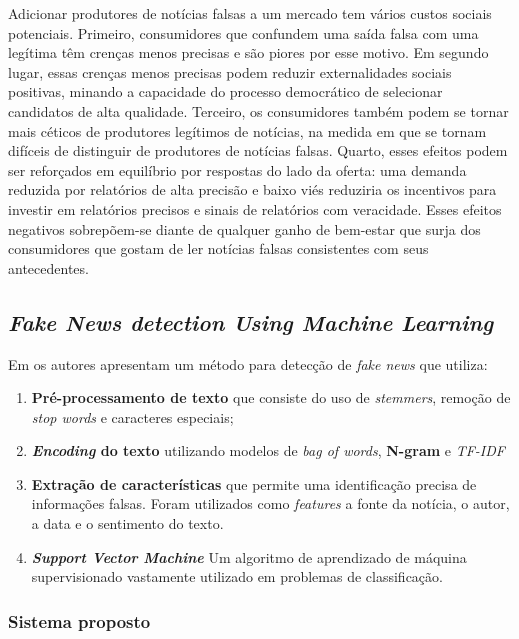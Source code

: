 Adicionar produtores de notícias falsas a um mercado tem vários custos sociais potenciais. 
Primeiro,
consumidores que confundem uma saída falsa com uma legítima têm crenças menos precisas
e são piores por esse motivo. Em segundo lugar, essas crenças menos precisas podem reduzir
externalidades sociais positivas, minando a capacidade do processo democrático de
selecionar candidatos de alta qualidade. Terceiro, os consumidores também podem se tornar mais céticos
de produtores legítimos de notícias, na medida em que se tornam difíceis de distinguir
de produtores de notícias falsas. Quarto, esses efeitos podem ser reforçados em equilíbrio por
respostas do lado da oferta: uma demanda reduzida por relatórios de alta precisão e baixo viés
reduziria os incentivos para investir em relatórios precisos e sinais de relatórios com veracidade.
Esses efeitos negativos sobrepõem-se diante de qualquer ganho de bem-estar que surja dos consumidores
que gostam de ler notícias falsas consistentes com seus antecedentes.


\subsection{\textit{Fake News detection Using Machine Learning}}

Em \cite{baarir2020} os autores apresentam um método para detecção de \textit{fake news} que utiliza: 
\begin{enumerate}
    \item \textbf{Pré-processamento de texto} que consiste do uso de \textit{stemmers}, remoção de \textit{stop words} e caracteres especiais;
    \item \textbf{\textit{Encoding} do texto} utilizando modelos de \textit{bag of words}, \textbf{N-gram} e \textit{TF-IDF}
    \item \textbf{Extração de características} que permite uma identificação precisa de informações falsas. Foram utilizados como \textit{features} a fonte da notícia, o autor, a data e o sentimento do texto.
    \item \textbf{\textit{Support Vector Machine}} Um algoritmo de aprendizado de máquina supervisionado vastamente utilizado em problemas de classificação.
\end{enumerate}


\subsubsection{Sistema proposto}

